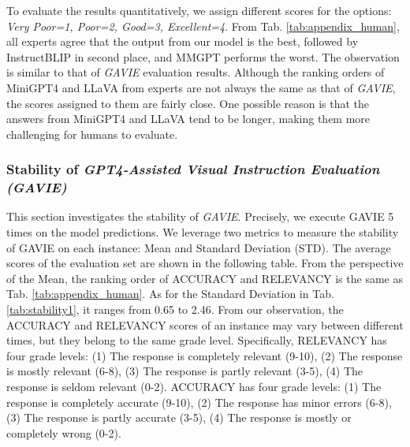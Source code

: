 To evaluate the results quantitatively, we assign different scores for the options: \textit{Very Poor=1, Poor=2, Good=3, Excellent=4}. From Tab. \ref{tab:appendix_human}, all experts agree that the output from our model is the best, followed by InstructBLIP in second place, and MMGPT performs the worst. %
The observation is similar to that of \textit{GAVIE} evaluation results. %
Although the ranking orders of MiniGPT4 and LLaVA from experts are not always the same as that of \textit{GAVIE}, the scores assigned to them are fairly close. One possible reason is that the answers from MiniGPT4 and LLaVA %
tend to be longer, %
making them more challenging for humans to evaluate. %

\subsubsection{Stability of \textit{GPT4-Assisted Visual Instruction Evaluation (GAVIE)}}
This section investigates the stability of \textit{GAVIE}. Precisely, we execute GAVIE 5 times on the model predictions. We leverage two metrics to measure the stability of GAVIE on each instance: Mean and Standard Deviation (STD). The average scores of the evaluation set are shown in the following table. From the perspective of the Mean, the ranking order of ACCURACY and RELEVANCY is the same as Tab. \ref{tab:appendix_human}. As for the Standard Deviation in Tab. \ref{tab:stability1}, it ranges from 0.65 to 2.46. From our observation, the ACCURACY and RELEVANCY scores of an instance may vary between different times, but they belong to the same grade level. Specifically, RELEVANCY has four grade levels: (1) The response is completely relevant (9-10), (2) The response is mostly relevant (6-8), (3) The response is partly relevant (3-5), (4) The response is seldom relevant (0-2). ACCURACY has four grade levels: (1) The response is completely accurate (9-10), (2) The response has minor errors (6-8), (3) The response is partly accurate (3-5), (4) The response is mostly or completely wrong (0-2).

